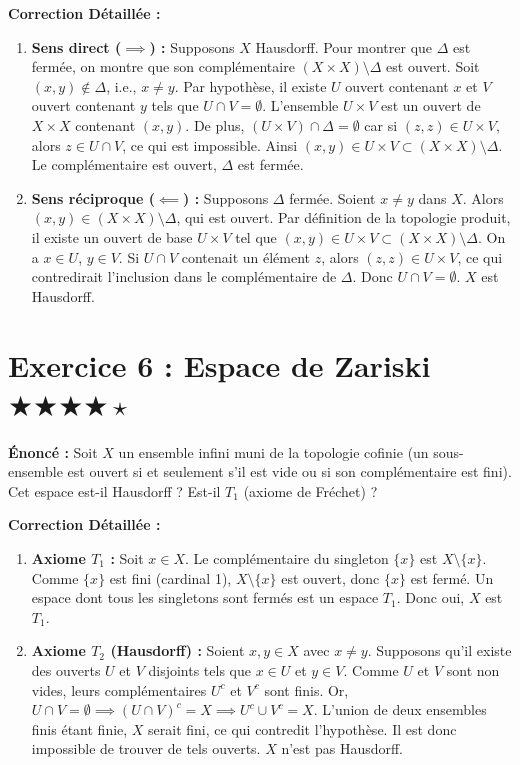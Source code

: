 \documentclass[11pt,a4paper]{article}
\begin{document}
\textbf{Correction Détaillée :}
\begin{enumerate}
\item \textbf{Sens direct ($\implies$) :} Supposons $X$ Hausdorff. Pour montrer que $\Delta$ est fermée, on montre que son complémentaire $(X \times X) \setminus \Delta$ est ouvert. Soit $(x, y) \notin \Delta$, i.e., $x \neq y$. Par hypothèse, il existe $U$ ouvert contenant $x$ et $V$ ouvert contenant $y$ tels que $U \cap V = \emptyset$. L'ensemble $U \times V$ est un ouvert de $X \times X$ contenant $(x, y)$. De plus, $(U \times V) \cap \Delta = \emptyset$ car si $(z, z) \in U \times V$, alors $z \in U \cap V$, ce qui est impossible. Ainsi $(x, y) \in U \times V \subset (X \times X) \setminus \Delta$. Le complémentaire est ouvert, $\Delta$ est fermée.

\item \textbf{Sens réciproque ($\impliedby$) :} Supposons $\Delta$ fermée. Soient $x \neq y$ dans $X$. Alors $(x, y) \in (X \times X) \setminus \Delta$, qui est ouvert. Par définition de la topologie produit, il existe un ouvert de base $U \times V$ tel que $(x, y) \in U \times V \subset (X \times X) \setminus \Delta$. On a $x \in U$, $y \in V$. Si $U \cap V$ contenait un élément $z$, alors $(z, z) \in U \times V$, ce qui contredirait l'inclusion dans le complémentaire de $\Delta$. Donc $U \cap V = \emptyset$. $X$ est Hausdorff.
\end{enumerate}





\section{Exercice 6 : Espace de Zariski \quad $\bigstar\bigstar\bigstar\bigstar\star$}


\textbf{Énoncé :}
Soit $X$ un ensemble infini muni de la topologie cofinie (un sous-ensemble est ouvert si et seulement s'il est vide ou si son complémentaire est fini). Cet espace est-il Hausdorff ? Est-il $T_1$ (axiome de Fréchet) ?

\textbf{Correction Détaillée :}
\begin{enumerate}
\item \textbf{Axiome $T_1$ :} Soit $x \in X$. Le complémentaire du singleton $\{x\}$ est $X \setminus \{x\}$. Comme $\{x\}$ est fini (cardinal 1), $X \setminus \{x\}$ est ouvert, donc $\{x\}$ est fermé. Un espace dont tous les singletons sont fermés est un espace $T_1$. Donc oui, $X$ est $T_1$.

\item \textbf{Axiome $T_2$ (Hausdorff) :} Soient $x, y \in X$ avec $x \neq y$. Supposons qu'il existe des ouverts $U$ et $V$ disjoints tels que $x \in U$ et $y \in V$. Comme $U$ et $V$ sont non vides, leurs complémentaires $U^c$ et $V^c$ sont finis. Or, $U \cap V = \emptyset \implies (U \cap V)^c = X \implies U^c \cup V^c = X$. L'union de deux ensembles finis étant finie, $X$ serait fini, ce qui contredit l'hypothèse. Il est donc impossible de trouver de tels ouverts. $X$ n'est pas Hausdorff.
\end{enumerate}
\end{document}
